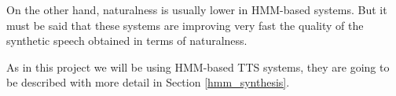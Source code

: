 On the other hand, naturalness is usually lower in HMM-based systems. But it must be said that these systems are improving very fast the quality of the synthetic speech obtained in terms of naturalness. 

As in this project we will be using HMM-based TTS systems, they are going to be described with more detail in Section \ref{hmm_synthesis}.
